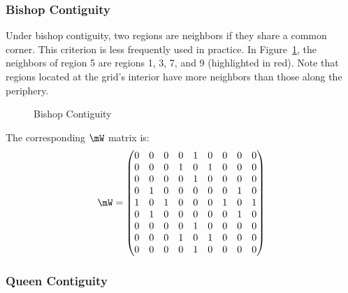 \subsubsection{Bishop Contiguity}

Under bishop contiguity, two regions are neighbors if they share a common corner. This criterion is less frequently used in practice. In Figure~\ref{fig:Bishop_cont_grid}, the neighbors of region 5 are regions 1, 3, 7, and 9 (highlighted in red). Note that regions located at the grid's interior have more neighbors than those along the periphery.

\begin{figure}[h]
\caption{Bishop Contiguity}
\label{fig:Bishop_cont_grid}
\centering
{}
\end{figure}

The corresponding $\mW$ matrix is:
\begin{equation*}
\mW = 
  \begin{pmatrix}
     0 & 0 & 0 & 0 & 1 & 0 & 0 & 0 & 0 \\
     0 & 0 & 0 & 1 & 0 & 1 & 0 & 0 & 0 \\
     0 & 0 & 0 & 0 & 1 & 0 & 0 & 0 & 0 \\
     0 & 1 & 0 & 0 & 0 & 0 & 0 & 1 & 0 \\
     1 & 0 & 1 & 0 & 0 & 0 & 1 & 0 & 1 \\
     0 & 1 & 0 & 0 & 0 & 0 & 0 & 1 & 0 \\
     0 & 0 & 0 & 0 & 1 & 0 & 0 & 0 & 0 \\
     0 & 0 & 0 & 1 & 0 & 1 & 0 & 0 & 0 \\
     0 & 0 & 0 & 0 & 1 & 0 & 0 & 0 & 0 \\
  \end{pmatrix}
\end{equation*}


\subsubsection{Queen Contiguity}

